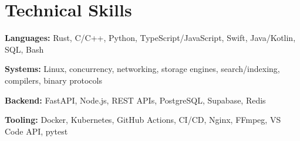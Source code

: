 \documentclass[10pt,letterpaper]{article}
\newcommand{\skill}[2]{\textbf{#1:} #2\par}
\begin{document}
\section{Technical Skills}
\skill{Languages}{Rust, C/C++, Python, TypeScript/JavaScript, Swift, Java/Kotlin, SQL, Bash}
\skill{Systems}{Linux, concurrency, networking, storage engines, search/indexing, compilers, binary protocols}
\skill{Backend}{FastAPI, Node.js, REST APIs, PostgreSQL, Supabase, Redis}
\skill{Tooling}{Docker, Kubernetes, GitHub Actions, CI/CD, Nginx, FFmpeg, VS Code API, pytest}
\end{document}
